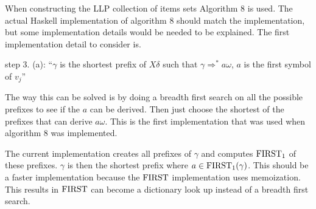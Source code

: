 When constructing the LLP collection of items sets Algorithm 8 \cite[13]{Vagner2007} is used. The actual Haskell implementation of algorithm 8 should match the implementation, but some implementation details would be needed to be explained. The first implementation detail to consider is. 
\begin{center}
    step 3. (a): ``$\gamma$ is the shortest prefix of $X\delta$ such that $\gamma \Rightarrow^* a \omega$, $a$ is the first symbol of $v_j$'' \cite{errata:Vagner2007}
\end{center}
The way this can be solved is by doing a breadth first search on all the possible prefixes to see if the $a$ can be derived. Then just choose the shortest of the prefixes that can derive $a\omega$. This is the first implementation that was used when algorithm 8 was implemented.

The current implementation creates all prefixes of $\gamma$ and computes $\text{FIRST}_1$ of these prefixes. $\gamma$ is then the shortest prefix where $a \in \text{FIRST}_1(\gamma)$. This should be a faster implementation because the $\text{FIRST}$ implementation uses memoization. This results in $\text{FIRST}$ can become a dictionary look up instead of a breadth first search.